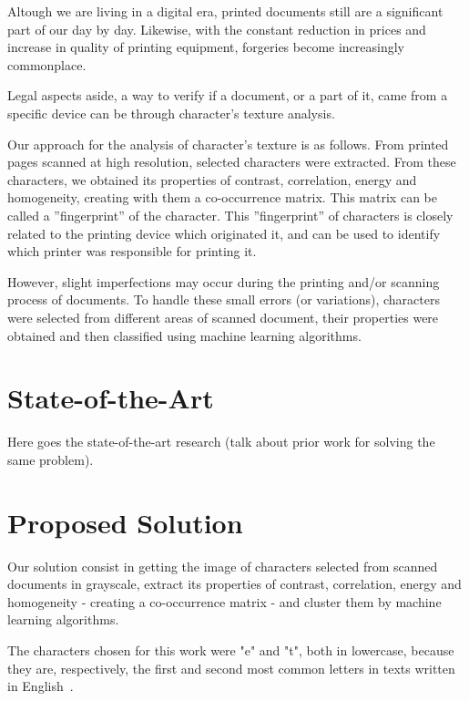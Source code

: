 \documentclass[10pt,twocolumn,letterpaper]{article}
\begin{document}
Altough we are living in a digital era, printed documents still are a significant part of our day by day. Likewise, with the constant reduction in prices and increase in quality of printing equipment, forgeries become increasingly commonplace.

Legal aspects aside, a way to verify if a document, or a part of it, came from a specific device can be through  character's texture analysis.

Our approach for the analysis of character's texture is as follows. From printed pages scanned at high resolution, selected characters were extracted. From these characters, we obtained its properties of contrast, correlation, energy and homogeneity, creating with them a co-occurrence matrix. This matrix can be called a ''fingerprint'' of the character. This ''fingerprint'' of  characters is closely related to the printing device which originated it, and can be used to identify which printer was responsible for printing it.

However, slight imperfections may occur during the printing and/or scanning process of documents. To handle these small errors (or variations), characters were selected from different areas of scanned document, their properties were obtained and then classified using machine learning algorithms.


\section{State-of-the-Art}
Here goes the state-of-the-art research (talk about prior work for solving the same problem). 

\section{Proposed Solution}

Our solution consist in getting the image of characters selected from scanned documents in grayscale, extract its properties of contrast, correlation, energy and homogeneity - creating a co-occurrence matrix - and cluster them by machine learning algorithms.

The characters chosen for this work were "e" and "t", both in lowercase, because they are, respectively, the first and second most common letters in texts written in English~\cite{Letter_Frequency}.
\end{document}

